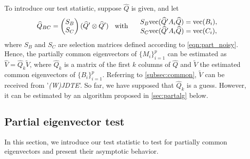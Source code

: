 \documentclass[12pt]{article}
\numberwithin{thm}{section}
\numberwithin{defn}{section}
\numberwithin{lem}{section}
\numberwithin{prop}{section}
\numberwithin{cor}{section}
\numberwithin{rem}{section}
\begin{document}
To introduce our test statistic, suppose $\widehat{Q}$ is given, and let
\begin{equation*}
\widehat{Q}_{BC} = \begin{pmatrix} S_B \\ S_C \end{pmatrix} (\widehat{Q}' \otimes \widehat{Q}')
\hspace{0.2cm}
\text{ with }
\hspace{0.5cm}
\begin{matrix}
S_B \mbox{vec}(\widehat{Q}' A_i \widehat{Q}) = \mbox{vec}(B_i), \\
S_C \mbox{vec}(\widehat{Q}' A_i \widehat{Q}) = \mbox{vec}(C_i),
\end{matrix}
\end{equation*}
where $S_B$ and $S_C$ are selection matrices defined 
according to \eqref{eqn:part_noisy}. Hence, the partially common eigenvectors of $\{M_i\}_{i = 1}^p$ can be estimated as $\widehat{V} = \widehat{Q}_k \widetilde{V}$, where $\widehat{Q}_k$ is a matrix of the first $k$ columns of $\widehat{Q}$ and $\widetilde{V}$ the estimated common eigenvectors of $\{B_i\}_{i = 1}^p$. Referring to \autoref{subsec:common}, $\widetilde{V}$ can be received from '\textit{(W)JDTE}'. So far, we have supposed that $\widehat{Q}_k$ is a guess. However, it can be estimated by an algorithm proposed in \autoref{sec:partalg} below.



\vspace{-0.5cm}
\subsection{Partial eigenvector test}\label{sec:partialtest}
\vspace{-0.3cm}
In this section, we introduce our test statistic to test for partially common eigenvectors and present their asymptotic behavior.
\end{document}
